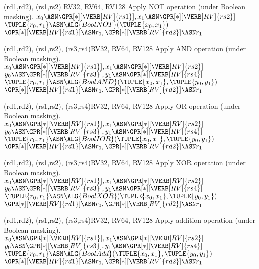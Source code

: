 
   {(rd1,rd2), (rs1,rs2)}           {RV32, RV64, RV128}{
  Apply          NOT operation 
  (under Boolean    masking).
}{
  $x_0 \ASN \GPR[*][{\VERB[RV]{rs1}}], x_1 \ASN \GPR[*][{\VERB[RV]{rs2}}]$ \;
  $\TUPLE{ r_0, r_1 } \ASN \ALG {BoolNOT}( \TUPLE{ x_0, x_1 } )$ \;
  $\GPR[*][{\VERB[RV]{rd1}}] \ASN r_0, \GPR[*][{\VERB[RV]{rd2}}] \ASN r_1$ \;
}


   {(rd1,rd2), (rs1,rs2), (rs3,rs4)}{RV32, RV64, RV128}{
  Apply          AND operation 
  (under Boolean    masking).
}{
  $x_0 \ASN \GPR[*][{\VERB[RV]{rs1}}], x_1 \ASN \GPR[*][{\VERB[RV]{rs2}}]$ \;
  $y_0 \ASN \GPR[*][{\VERB[RV]{rs3}}], y_1 \ASN \GPR[*][{\VERB[RV]{rs4}}]$ \;
  $\TUPLE{ r_0, r_1 } \ASN \ALG {BoolAND}( \TUPLE{ x_0, x_1 }, \TUPLE{ y_0, y_1 } )$ \;
  $\GPR[*][{\VERB[RV]{rd1}}] \ASN r_0, \GPR[*][{\VERB[RV]{rd2}}] \ASN r_1$ \;
}


   {(rd1,rd2), (rs1,rs2), (rs3,rs4)}{RV32, RV64, RV128}{
  Apply           OR operation 
  (under Boolean    masking).
}{
  $x_0 \ASN \GPR[*][{\VERB[RV]{rs1}}], x_1 \ASN \GPR[*][{\VERB[RV]{rs2}}]$ \;
  $y_0 \ASN \GPR[*][{\VERB[RV]{rs3}}], y_1 \ASN \GPR[*][{\VERB[RV]{rs4}}]$ \;
  $\TUPLE{ r_0, r_1 } \ASN \ALG {BoolIOR}( \TUPLE{ x_0, x_1 }, \TUPLE{ y_0, y_1 } )$ \;
  $\GPR[*][{\VERB[RV]{rd1}}] \ASN r_0, \GPR[*][{\VERB[RV]{rd2}}] \ASN r_1$ \;
}


   {(rd1,rd2), (rs1,rs2), (rs3,rs4)}{RV32, RV64, RV128}{
  Apply          XOR operation 
  (under Boolean    masking).
}{
  $x_0 \ASN \GPR[*][{\VERB[RV]{rs1}}], x_1 \ASN \GPR[*][{\VERB[RV]{rs2}}]$ \;
  $y_0 \ASN \GPR[*][{\VERB[RV]{rs3}}], y_1 \ASN \GPR[*][{\VERB[RV]{rs4}}]$ \;
  $\TUPLE{ r_0, r_1 } \ASN \ALG {BoolXOR}( \TUPLE{ x_0, x_1 }, \TUPLE{ y_0, y_1 } )$ \;
  $\GPR[*][{\VERB[RV]{rd1}}] \ASN r_0, \GPR[*][{\VERB[RV]{rd2}}] \ASN r_1$ \;
}


   {(rd1,rd2), (rs1,rs2), (rs3,rs4)}{RV32, RV64, RV128}{
  Apply     addition operation 
  (under Boolean    masking).
}{
  $x_0 \ASN \GPR[*][{\VERB[RV]{rs1}}], x_1 \ASN \GPR[*][{\VERB[RV]{rs2}}]$ \;
  $y_0 \ASN \GPR[*][{\VERB[RV]{rs3}}], y_1 \ASN \GPR[*][{\VERB[RV]{rs4}}]$ \;
  $\TUPLE{ r_0, r_1 } \ASN \ALG {BoolAdd}( \TUPLE{ x_0, x_1 }, \TUPLE{ y_0, y_1 } )$ \;
  $\GPR[*][{\VERB[RV]{rd1}}] \ASN r_0, \GPR[*][{\VERB[RV]{rd2}}] \ASN r_1$ \;
}

